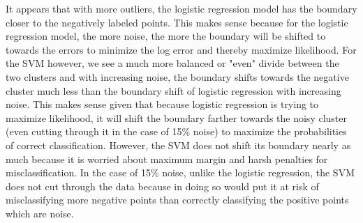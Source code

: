\documentclass[12 pt]{article}
\begin{document}
		\noindent It appears that with more outliers, the logistic regression model has the boundary closer to the negatively labeled points. This makes sense because for the logistic regression model, the more noise, the more the boundary will be shifted to towards the errors to minimize the log error and thereby maximize likelihood. For the SVM however, we see a much more balanced or "even" divide between the two clusters and with increasing noise, the boundary shifts towards the negative cluster much less than the boundary shift of logistic regression with increasing noise. This makes sense given that because logistic regression is trying to maximize likelihood, it will shift the boundary farther towards the noisy cluster (even cutting through it in the case of 15\% noise) to maximize the probabilities of correct classification. However, the SVM does not shift its boundary nearly as much because it is worried about maximum margin and harsh penalties for misclassification. In the case of 15\% noise, unlike the logistic regression, the SVM does not cut through the data because in doing so would put it at risk of misclassifying more negative points than correctly classifying the positive points which are noise. \\
	
\end{document}
